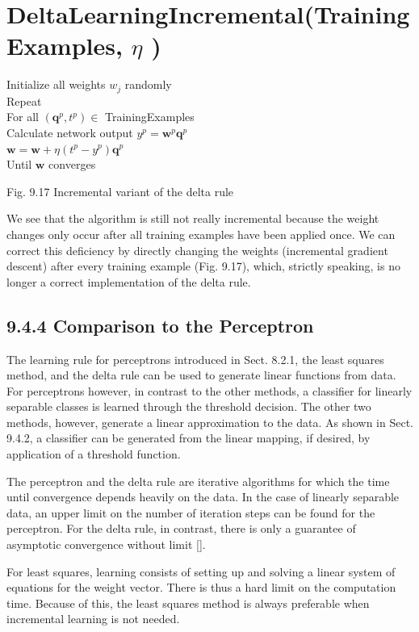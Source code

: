 \documentclass[10pt]{article}
\begin{document}
\section*{DeltaLearningIncremental(TrainingExamples, $\eta$ )}
Initialize all weights $w_{j}$ randomly\\
Repeat\\
For all $\left(\boldsymbol{q}^{p}, t^{p}\right) \in$ TrainingExamples\\
Calculate network output $y^{p}=\boldsymbol{w}^{p} \boldsymbol{q}^{p}$\\
$\boldsymbol{w}=\boldsymbol{w}+\eta\left(t^{p}-y^{p}\right) \boldsymbol{q}^{p}$\\
Until $\boldsymbol{w}$ converges

Fig. 9.17 Incremental variant of the delta rule

We see that the algorithm is still not really incremental because the weight changes only occur after all training examples have been applied once. We can correct this deficiency by directly changing the weights (incremental gradient descent) after every training example (Fig. 9.17), which, strictly speaking, is no longer a correct implementation of the delta rule.


\subsection*{9.4.4 Comparison to the Perceptron}
The learning rule for perceptrons introduced in Sect. 8.2.1, the least squares method, and the delta rule can be used to generate linear functions from data. For perceptrons however, in contrast to the other methods, a classifier for linearly separable classes is learned through the threshold decision. The other two methods, however, generate a linear approximation to the data. As shown in Sect. 9.4.2, a classifier can be generated from the linear mapping, if desired, by application of a threshold function.

The perceptron and the delta rule are iterative algorithms for which the time until convergence depends heavily on the data. In the case of linearly separable data, an upper limit on the number of iteration steps can be found for the perceptron. For the delta rule, in contrast, there is only a guarantee of asymptotic convergence without limit [\cite{hertz1991introduction}].

For least squares, learning consists of setting up and solving a linear system of equations for the weight vector. There is thus a hard limit on the computation time. Because of this, the least squares method is always preferable when incremental learning is not needed.
\end{document}

